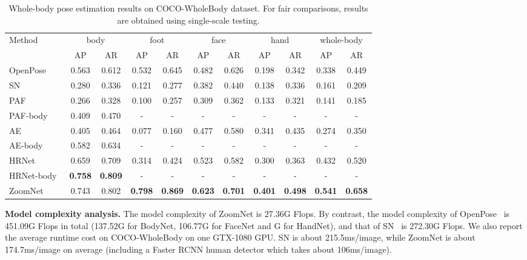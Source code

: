 \documentclass[runningheads]{llncs}
\begin{document}
	\begin{table}[t]
		\scriptsize
		\caption{Whole-body pose estimation results on COCO-WholeBody dataset. For fair comparisons, results are obtained using single-scale testing.}
		\begin{center}
			\begin{tabular}{l|cc|cc|cc|cc|cc}
				\hline
				Method & \multicolumn{2}{c|}{body}  & \multicolumn{2}{c|}{foot}  & \multicolumn{2}{c|}{face}  & \multicolumn{2}{c|}{hand} & \multicolumn{2}{c}{whole-body} \\
				\cline{2-11}
				&  AP     & AR     & AP   & AR     &  AP  & AR     & AP    & AR   &  AP     & AR  \\
				\hline
				OpenPose~\cite{cao2018openpose} & 0.563 & 0.612 & 0.532 & 0.645 & 0.482 & 0.626 & 0.198 & 0.342 & 0.338 & 0.449 \\ 
				SN~\cite{hidalgo2019single} & 0.280 & 0.336 & 0.121 & 0.277 & 0.382 & 0.440 & 0.138 & 0.336 & 0.161 & 0.209 \\ 
				PAF~\cite{cao2017realtime} & 0.266 & 0.328 & 0.100 & 0.257 & 0.309 & 0.362 & 0.133 & 0.321 & 0.141 & 0.185 \\ 
				PAF-body~\cite{cao2017realtime} & 0.409 & 0.470 & - & - & - & - & - & - & - & - \\ 
				AE~\cite{newell2017associative} & 0.405 & 0.464 & 0.077 & 0.160 & 0.477 & 0.580 & 0.341 & 0.435 & 0.274 & 0.350 \\
				AE-body~\cite{newell2017associative} & 0.582 & 0.634 & - & - & - & - & - & - & - & - \\ \hline
				HRNet~\cite{sun2019deep}  & 0.659 & 0.709 & 0.314 & 0.424 & 0.523 & 0.582 & 0.300 & 0.363 & 0.432 & 0.520 \\
				HRNet-body~\cite{sun2019deep} & \textbf{0.758} & \textbf{0.809} & - & - & - & - & - & - & - & -  \\ \hline
				ZoomNet & 0.743 & 0.802 & \textbf{0.798} & \textbf{0.869} & \textbf{0.623} & \textbf{0.701} & \textbf{0.401} & \textbf{0.498} & \textbf{0.541} & \textbf{0.658}  \\
				\hline
			\end{tabular}
		\end{center}
		\label{tab:compare}
	\end{table}
	
	\textbf{Model complexity analysis.}
	The model complexity of ZoomNet is 27.36G Flops. By contrast, the model complexity of OpenPose~\cite{cao2018openpose} is 451.09G Flops in total (137.52G for BodyNet, 106.77G for FaceNet and G for HandNet), and that of SN~\cite{hidalgo2019single} is 272.30G Flops. We also report the average runtime cost on COCO-WholeBody on one GTX-1080 GPU. SN is about 215.5ms/image, while ZoomNet is about 174.7ms/image on average (including a Faster RCNN human detector which takes about 106ms/image).
	
\end{document}
